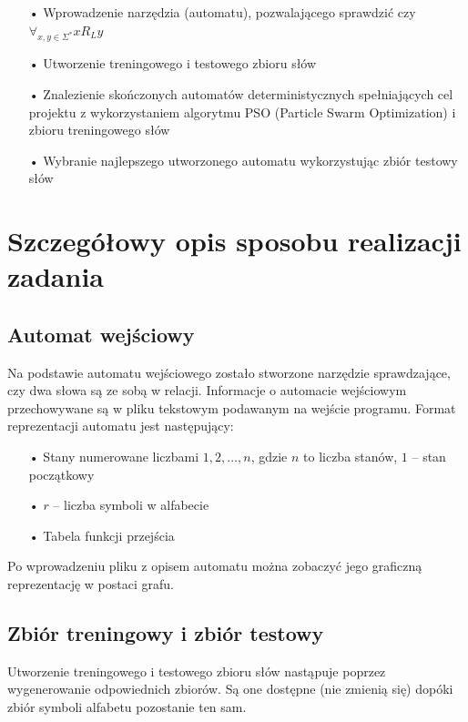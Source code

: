 \documentclass[runningheads,a4paper]{llncs}
\begin{document}
\begin{itemize}
\item[•] Wprowadzenie narzędzia (automatu), pozwalającego sprawdzić czy $\forall_{x,y \in \Sigma^*} x R_{L} y$
\item[•] Utworzenie treningowego i testowego zbioru słów
\item[•] Znalezienie skończonych automatów deterministycznych spełniających cel projektu z wykorzystaniem algorytmu PSO (Particle Swarm Optimization) i zbioru treningowego słów
\item[•] Wybranie najlepszego utworzonego automatu wykorzystując zbiór testowy słów
\end{itemize}

\newpage

\section{Szczegółowy opis sposobu realizacji zadania}

\subsection{Automat wejściowy}

Na podstawie automatu wejściowego zostało stworzone narzędzie sprawdzające, czy dwa słowa są ze sobą w relacji. Informacje o automacie wejściowym przechowywane są w pliku tekstowym podawanym na wejście programu. Format reprezentacji automatu jest następujący:

\begin{itemize}
\item[•] Stany numerowane liczbami $1, 2, …, n$, gdzie $n$ to liczba stanów, $1$ – stan początkowy
\item[•] $r$ – liczba symboli w alfabecie
\item[•] Tabela funkcji przejścia
\end{itemize}

Po wprowadzeniu pliku z opisem automatu można zobaczyć jego graficzną reprezentację w postaci grafu.

\subsection{Zbiór treningowy i zbiór testowy}

Utworzenie treningowego i testowego zbioru słów nastąpuje poprzez wygenerowanie odpowiednich zbiorów. Są one dostępne (nie zmienią się) dopóki zbiór symboli alfabetu pozostanie ten sam. \\
\end{document}
